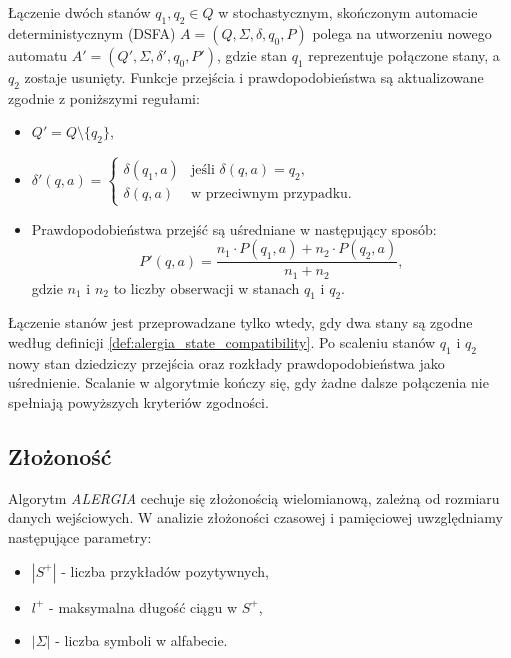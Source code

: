 \begin{definition}  
\label{def:alergia_state_merging}  
Łączenie dwóch stanów \( q_1, q_2 \in Q \) w stochastycznym, skończonym automacie deterministycznym (DSFA) \( A = (Q, \Sigma, \delta, q_0, P) \) polega na utworzeniu nowego automatu \( A' = (Q', \Sigma, \delta', q_0, P') \), gdzie stan \( q_1 \) reprezentuje połączone stany, a \( q_2 \) zostaje usunięty. Funkcje przejścia i prawdopodobieństwa są aktualizowane zgodnie z poniższymi regułami:  
\begin{itemize}  
    \item \( Q' = Q \setminus \{q_2\} \),  
    \item \( \delta'(q, a) =  
    \begin{cases}  
        \delta(q_1, a) & \text{jeśli } \delta(q, a) = q_2, \\  
        \delta(q, a) & \text{w przeciwnym przypadku.}  
    \end{cases}  
    \)  
    \item Prawdopodobieństwa przejść są uśredniane w następujący sposób:  
    \[
    P'(q, a) = \frac{n_1 \cdot P(q_1, a) + n_2 \cdot P(q_2, a)}{n_1 + n_2},
    \]  
    gdzie \( n_1 \) i \( n_2 \) to liczby obserwacji w stanach \( q_1 \) i \( q_2 \).  
\end{itemize}  
\end{definition}  

Łączenie stanów jest przeprowadzane tylko wtedy, gdy dwa stany są zgodne według definicji \ref{def:alergia_state_compatibility}. Po scaleniu stanów \( q_1 \) i \( q_2 \) nowy stan dziedziczy przejścia oraz rozkłady prawdopodobieństwa jako uśrednienie. Scalanie w algorytmie kończy się, gdy żadne dalsze połączenia nie spełniają powyższych kryteriów zgodności.


\subsection{Złożoność}  
Algorytm \textit{ALERGIA} cechuje się złożonością wielomianową, zależną od rozmiaru danych wejściowych. W analizie złożoności czasowej i pamięciowej uwzględniamy następujące parametry:  
\begin{itemize}  
    \item \(|S^+|\) - liczba przykładów pozytywnych,  
    \item \( l^+ \) - maksymalna długość ciągu w \( S^+ \),  
    \item \(|\Sigma|\) - liczba symboli w alfabecie.  
\end{itemize}  

